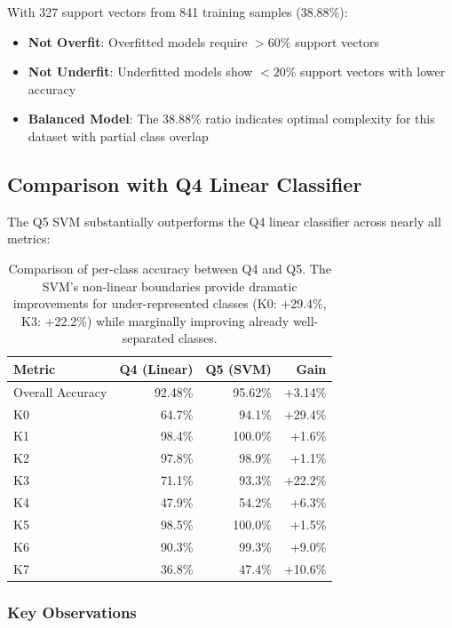 \documentclass[12pt]{article}
\begin{document}
With 327 support vectors from 841 training samples (38.88\%):

\begin{itemize}
    \item \textbf{Not Overfit}: Overfitted models require $> 60\%$ support vectors
    \item \textbf{Not Underfit}: Underfitted models show $< 20\%$ support vectors with lower accuracy
    \item \textbf{Balanced Model}: The 38.88\% ratio indicates optimal complexity for this dataset with partial class overlap
\end{itemize}

\subsection{Comparison with Q4 Linear Classifier}

The Q5 SVM substantially outperforms the Q4 linear classifier across nearly all metrics:

\begin{table}[h]
\centering
\begin{tabular}{lrr|r}
\toprule
\textbf{Metric} & \textbf{Q4 (Linear)} & \textbf{Q5 (SVM)} & \textbf{Gain} \\
\midrule
Overall Accuracy & 92.48\% & 95.62\% & +3.14\% \\
\midrule
K0 & 64.7\% & 94.1\% & +29.4\% \\
K1 & 98.4\% & 100.0\% & +1.6\% \\
K2 & 97.8\% & 98.9\% & +1.1\% \\
K3 & 71.1\% & 93.3\% & +22.2\% \\
K4 & 47.9\% & 54.2\% & +6.3\% \\
K5 & 98.5\% & 100.0\% & +1.5\% \\
K6 & 90.3\% & 99.3\% & +9.0\% \\
K7 & 36.8\% & 47.4\% & +10.6\% \\
\bottomrule
\end{tabular}
\caption{Comparison of per-class accuracy between Q4 and Q5. The SVM's non-linear boundaries provide dramatic improvements for under-represented classes (K0: +29.4\%, K3: +22.2\%) while marginally improving already well-separated classes.}
\label{tab:q4_vs_q5}
\end{table}

\subsubsection{Key Observations}
\end{document}
